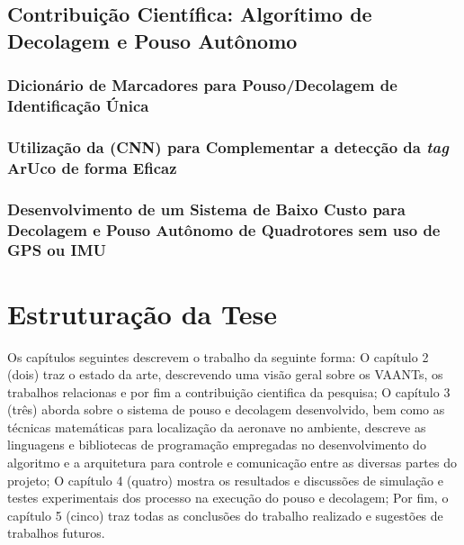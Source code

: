     


\subsection{Contribuição Científica: Algorítimo de Decolagem e Pouso Autônomo}

	\subsubsection{Dicionário de Marcadores para Pouso/Decolagem de Identificação Única}

	\subsubsection{Utilização da (CNN) para Complementar a detecção da \textit{tag} ArUco de forma Eficaz}

	\subsubsection{Desenvolvimento de um Sistema de Baixo Custo para Decolagem e Pouso Autônomo de Quadrotores sem uso de GPS ou IMU}

\section{Estruturação da Tese}

Os capítulos seguintes descrevem o trabalho da seguinte forma: O capítulo 2 (dois) traz o estado da arte, descrevendo uma visão geral sobre os VAANTs, os trabalhos relacionas e por fim a contribuição cientifica da pesquisa; O capítulo 3 (três) aborda sobre o sistema de pouso e decolagem desenvolvido, bem como as técnicas matemáticas para localização da aeronave no ambiente, descreve as linguagens e bibliotecas de programação empregadas no desenvolvimento do algoritmo e a arquitetura para controle e comunicação entre as diversas partes do projeto; O capítulo 4 (quatro) mostra os resultados e discussões de simulação e testes experimentais dos processo na execução do pouso e decolagem; Por fim, o capítulo 5 (cinco) traz todas as conclusões do trabalho realizado e sugestões de trabalhos futuros.





